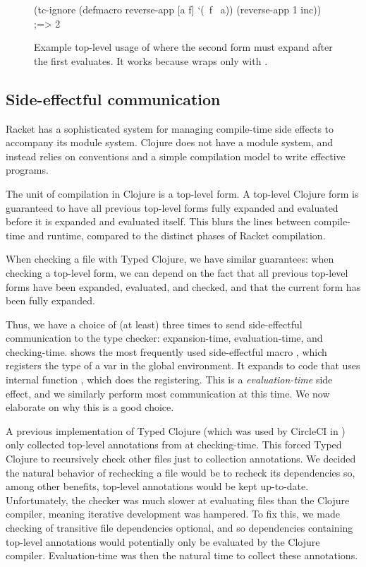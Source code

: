 \begin{figure}
\begin{cljlisting}
(tc-ignore
  (defmacro reverse-app [a f] `(~f ~a))
  (reverse-app 1 inc)) ;=> 2
\end{cljlisting}
  \caption{Example top-level usage of 
           where the second form must expand after the first evaluates.
  It works because  wraps only with .}
  \label{fig:analyzer:tc-ignore-usage}
\end{figure}

\subsection{Side-effectful communication}
\label{analyzer:extensibility:side-effects}

Racket has a sophisticated system for managing compile-time side effects
to accompany its module system.
Clojure does not have a module system, and instead relies on conventions
and a simple compilation model to write effective programs.

The unit of compilation in Clojure is a top-level form. A top-level Clojure form
is guaranteed to have all previous top-level forms fully expanded
and evaluated before it is expanded and evaluated itself.
This blurs the lines between compile-time and runtime, compared to the
distinct phases of Racket compilation.

When checking a file with Typed Clojure, we have similar guarantees:
when checking a top-level form, we can depend on the fact that all
previous top-level forms have been expanded, evaluated, and checked,
and that the current form has been fully expanded.

Thus, we have a choice of (at least) three times to send side-effectful communication
to the type checker:
expansion-time, evaluation-time, and checking-time.
 shows the most frequently used
side-effectful macro , which registers the type of a var in the
global environment.
It expands to code that uses internal function , which does
the registering. This is a \emph{evaluation-time} side effect,
and we similarly perform most communication at this time.
We now elaborate on why this is a good choice.

A previous implementation of Typed Clojure (which was used by CircleCI
in ) only collected top-level annotations
from  at checking-time. This forced Typed Clojure to recursively
check other files just to collection annotations.
We decided the natural behavior of rechecking a file would be to
recheck its dependencies so, among other benefits, top-level annotations
would be kept up-to-date.
Unfortunately, the checker was much slower at evaluating files
than the Clojure compiler, meaning iterative development was hampered.
To fix this, we made checking of transitive file dependencies optional, and
so dependencies containing top-level annotations would potentially only 
be evaluated by the Clojure compiler.
Evaluation-time was then the natural time to collect these annotations.

